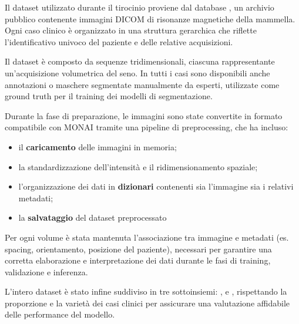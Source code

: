 

Il dataset utilizzato durante il tirocinio proviene dal database , un archivio pubblico contenente immagini DICOM di risonanze magnetiche della mammella. Ogni caso clinico è organizzato in una struttura gerarchica che riflette l'identificativo univoco del paziente e delle relative acquisizioni.

Il dataset è composto da sequenze  tridimensionali, ciascuna rappresentante un'acquisizione volumetrica del seno. In tutti i casi sono disponibili anche annotazioni o maschere segmentate manualmente da esperti, utilizzate come ground truth per il training dei modelli di segmentazione.

Durante la fase di preparazione, le immagini sono state convertite in formato compatibile con MONAI tramite una pipeline di preprocessing, che ha incluso:
\begin{itemize}
    \item il \textbf{caricamento} delle immagini in memoria;
    \item la standardizzazione dell'intensità e il ridimensionamento spaziale;
    \item l'organizzazione dei dati in \textbf{dizionari} contenenti sia l'immagine sia i relativi metadati;
    \item la \textbf{salvataggio} del dataset preprocessato 
\end{itemize}

Per ogni volume è stata mantenuta l'associazione tra immagine e metadati (es. spacing, orientamento, posizione del paziente), necessari per garantire una corretta elaborazione e interpretazione dei dati durante le fasi di training, validazione e inferenza.

L'intero dataset è stato infine suddiviso in tre sottoinsiemi: ,  e , rispettando la proporzione e la varietà dei casi clinici per assicurare una valutazione affidabile delle performance del modello.